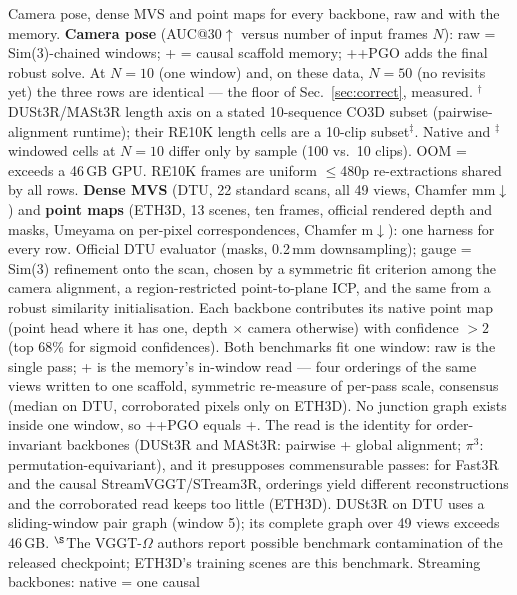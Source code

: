\begin{table}[t]
\centering\scriptsize
\setlength{\tabcolsep}{2.4pt}
\caption{Camera pose, dense MVS and point maps for every backbone, raw and with the memory.
\textbf{Camera pose} (AUC@30$\uparrow$ versus number of input frames $N$): raw = Sim(3)-chained
windows; +\smr{} = causal scaffold memory; +\smr{}+PGO adds the final robust solve. At $N{=}10$
(one window) and, on these data, $N{=}50$ (no revisits yet) the three rows are identical --- the
floor of Sec.~\ref{sec:correct}, measured. $^{\dagger}$DUSt3R/MASt3R length axis on a stated
10-sequence CO3D subset (pairwise-alignment runtime); their RE10K length cells are a 10-clip
subset$^{\ddagger}$. Native and $^{\ddagger}$ windowed cells at $N{=}10$ differ only by sample
(100 vs.\ 10 clips). OOM = exceeds a 46\,GB GPU. RE10K frames are uniform $\le$480p
re-extractions shared by all rows.
\textbf{Dense MVS} (DTU, 22 standard scans, all 49 views, Chamfer mm$\downarrow$) and
\textbf{point maps} (ETH3D, 13 scenes, ten frames, official rendered depth and masks,
Umeyama on per-pixel correspondences, Chamfer m$\downarrow$): one harness for every row.
Official DTU evaluator (masks, 0.2\,mm downsampling); gauge = Sim(3) refinement onto the scan,
chosen by a symmetric fit criterion among the camera alignment, a region-restricted
point-to-plane ICP, and the same from a robust similarity initialisation. Each backbone
contributes its native point map (point head where it has one, depth $\times$ camera
otherwise) with confidence $>2$ (top 68\% for sigmoid confidences). Both benchmarks fit one
window: raw is the single pass; +\smr{} is the memory's in-window read --- four orderings of the
same views written to one scaffold, symmetric re-measure of per-pass scale, consensus (median
on DTU, corroborated pixels only on ETH3D). No junction graph exists inside one window, so
+\smr{}+PGO equals +\smr{}. The read is the identity for order-invariant backbones (DUSt3R and
MASt3R: pairwise + global alignment; $\pi^3$: permutation-equivariant), and it presupposes
commensurable passes: for Fast3R and the causal StreamVGGT/STream3R, orderings yield
different reconstructions and the corroborated read keeps too little (ETH3D). DUSt3R on DTU
uses a sliding-window pair graph (window 5); its complete graph over 49 views exceeds 46\,GB.
$^{\S}$The VGGT-$\Omega$ authors report possible benchmark contamination of the released
checkpoint; ETH3D's training scenes are this benchmark. Streaming backbones: native = one causal
}
\end{table}
